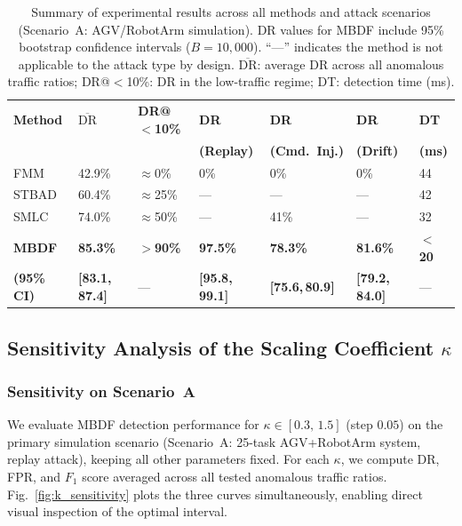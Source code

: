 \documentclass[manuscript,screen,review]{acmart}
\begin{document}
\begin{table}[!t]
\renewcommand{\arraystretch}{1.35}
\caption{Summary of experimental results across all methods
and attack scenarios (Scenario~A: AGV/RobotArm simulation).
DR values for MBDF include 95\% bootstrap confidence
intervals ($B = 10{,}000$). ``---'' indicates the method
is not applicable to the attack type by design.
$\overline{\mathrm{DR}}$: average DR across all anomalous
traffic ratios; DR@$<$10\%: DR in the low-traffic regime;
DT: detection time (ms).}
\label{tab:summary}
\centering
\small
\begin{tabular}{lllllll}
\toprule
\textbf{Method} &
$\overline{\mathrm{DR}}$ &
\textbf{DR@$<$10\%} &
\textbf{DR} &
\textbf{DR} &
\textbf{DR} &
\textbf{DT} \\
& & &
\textbf{(Replay)} &
\textbf{(Cmd.\ Inj.)} &
\textbf{(Drift)} &
\textbf{(ms)} \\
\midrule
FMM   & 42.9\% & $\approx$0\%  & 0\%   & 0\%   & 0\%   & 44 \\
STBAD & 60.4\% & $\approx$25\% & ---   & ---   & ---   & 42 \\
SMLC  & 74.0\% & $\approx$50\% & ---   & 41\%  & ---   & 32 \\
\midrule
\textbf{MBDF} &
  \textbf{85.3\%} &
  \textbf{$>$90\%} &
  \textbf{97.5\%} &
  \textbf{78.3\%} &
  \textbf{81.6\%} &
  \textbf{$<$20} \\
\textbf{(95\% CI)} &
  \textbf{[83.1,\,87.4]} & --- &
  \textbf{[95.8,\,99.1]} &
  \textbf{[75.6,\,80.9]} &
  \textbf{[79.2,\,84.0]} & --- \\
\bottomrule
\end{tabular}
\end{table}

\subsection{Sensitivity Analysis of the Scaling
Coefficient $\kappa$}
\label{sec:sensitivity}

\subsubsection{Sensitivity on Scenario~A}
\label{sec:kappa_scenA}

We evaluate MBDF detection performance for
$\kappa \in [0.3,\,1.5]$ (step $0.05$) on the primary
simulation scenario (Scenario~A: 25-task AGV+RobotArm system,
replay attack), keeping all other parameters fixed.
For each $\kappa$, we compute DR, FPR, and $F_1$ score
averaged across all tested anomalous traffic ratios.
Fig.~\ref{fig:k_sensitivity} plots the three curves
simultaneously, enabling direct visual inspection of the
optimal interval.
\end{document}
